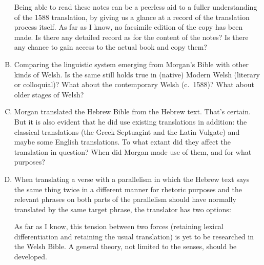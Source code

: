 \begin{enumerate}[A.]
		Being able to read these notes can be a peerless aid to a fuller understanding of the 1588 translation, by giving us a glance at a record of the translation process itself. As far as I know, no facsimile edition of the copy has been made. Is there any detailed record as for the content of the notes? Is there any chance to gain access to the actual book and copy them?

	\item Comparing the linguistic system emerging from Morgan’s Bible with other kinds of Welsh. Is the same still holds true in (native) Modern Welsh (literary or colloquial)? What about the contemporary Welsh (c.~1588)? What about older stages of Welsh?

	\item Morgan translated the Hebrew Bible from the Hebrew text. That’s certain. But it is also evident that he did use existing translations in addition: the classical translations (the Greek Septuagint and the Latin Vulgate) and maybe some English translations. To what extant did they affect the translation in question? When did Morgan made use of them, and for what purposes?

	\item When translating a verse with a parallelism in which the Hebrew text says the same thing twice in a different manner for rhetoric purposes and the relevant phrases on both parts of the parallelism should have normally translated by the same target phrase, the translator has two options:
		As far as I know, this tension between two forces (retaining lexical differentiation and retaining the usual translation) is yet to be researched in the Welsh Bible. A general theory, not limited to the senses, should be developed.
\end{enumerate}

